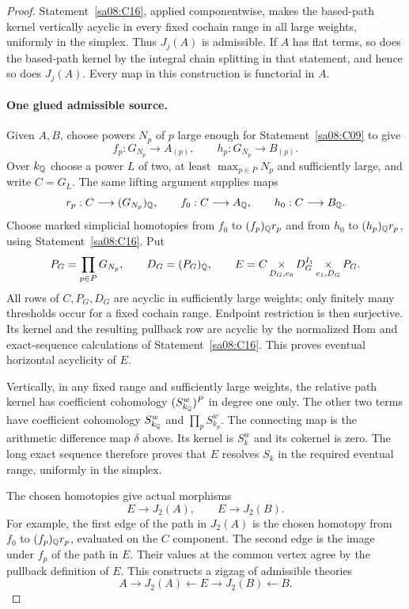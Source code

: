 \begin{proof}
Statement~\ref{sa08:C16}, applied componentwise, makes the based-path
kernel vertically acyclic in every fixed cochain range in all
large weights, uniformly in the simplex. Thus $J_j(A)$ is
admissible. If $A$ has flat terms, so does the based-path kernel
by the integral chain splitting in that statement, and hence so
does $J_j(A)$. Every map in this construction is functorial in $A$.

\paragraph{One glued admissible source.}
Given $A,B$, choose powers $N_p$ of $p$ large enough for
Statement~\ref{sa08:C09} to give
\[
 f_p:G_{N_p}\longrightarrow A_{(p)},\qquad
 h_p:G_{N_p}\longrightarrow B_{(p)}.
\]
Over $k_{\mathbb Q}$ choose a power $L$ of two, at least
$\max_{p\in P}N_p$ and sufficiently large, and write $C=G_L$.
The same lifting argument supplies maps
\[
 r_p:C\longrightarrow(G_{N_p})_{\mathbb Q},\qquad
 f_0:C\longrightarrow A_{\mathbb Q},\qquad
 h_0:C\longrightarrow B_{\mathbb Q}.
\]
Choose marked simplicial homotopies from $f_0$ to $(f_p)_{\mathbb Q}r_p$
and from $h_0$ to $(h_p)_{\mathbb Q}r_p$, using
Statement~\ref{sa08:C16}. Put
\[
 P_G=\prod_{p\in P}G_{N_p},\qquad D_G=(P_G)_{\mathbb Q},\qquad
 E=C\mathop{\times}_{D_G,e_0}D_G^{I_1}
       \mathop{\times}_{e_1,D_G}P_G.
\]
All rows of $C,P_G,D_G$ are acyclic in sufficiently large weights;
only finitely many thresholds occur for a fixed cochain range.
Endpoint restriction is then surjective. Its kernel and the
resulting pullback row are acyclic by the normalized Hom and
exact-sequence calculations of Statement~\ref{sa08:C16}. This
proves eventual horizontal acyclicity of $E$.

Vertically, in any fixed range and sufficiently large weights,
the relative path kernel has coefficient cohomology
$(S_{k_{\mathbb Q}}^w)^P$ in degree one only. The other two terms have
coefficient cohomology $S_{k_{\mathbb Q}}^w$ and
$\prod_pS_{k_p}^w$. The connecting map is the arithmetic difference
map $\delta$ above. Its kernel is $S_k^w$ and its cokernel is zero.
The long exact sequence therefore proves that $E$ resolves $S_k$
in the required eventual range, uniformly in the simplex.

The chosen homotopies give actual morphisms
\[
 E\longrightarrow J_2(A),\qquad E\longrightarrow J_2(B).
\]
For example, the first edge of the path in $J_2(A)$ is the chosen
homotopy from $f_0$ to $(f_p)_{\mathbb Q}r_p$, evaluated on the $C$
component. The second edge is the image under $f_p$ of the path
in $E$. Their values at the common vertex agree by the pullback
definition of $E$. This constructs a zigzag of admissible theories
\[
 A\longrightarrow J_2(A)\longleftarrow E
 \longrightarrow J_2(B)\longleftarrow B.
\]


\end{proof}
